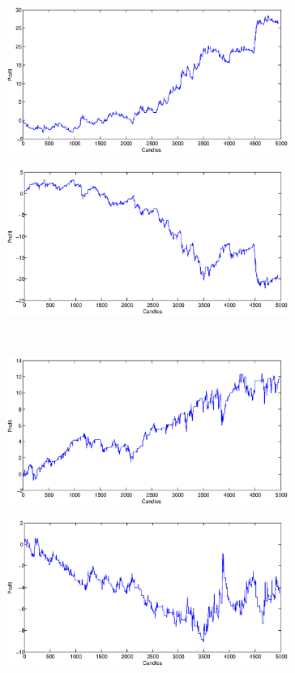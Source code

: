 \documentclass{tewiart}
\begin{document}
\begin{figure}[h]
\centering
\begin{minipage}{.49\linewidth}
\centering 
\includegraphics[width=0.82\textwidth]{S1a.eps}
\label{jedno}
\end{minipage}
\begin{minipage}{.49\linewidth}
\centering 
\includegraphics[width=0.82\textwidth]{S1b.eps}
\label{dwu}
\end{minipage}
\\
\begin{minipage}{.49\linewidth}
\centering 
\includegraphics[width=0.82\textwidth]{S1c.eps}
\label{cztero}
\end{minipage}
\begin{minipage}{.49\linewidth}
\centering 
\includegraphics[width=0.82\textwidth]{S1d.eps}

\end{minipage}
\end{figure}
\end{document}
